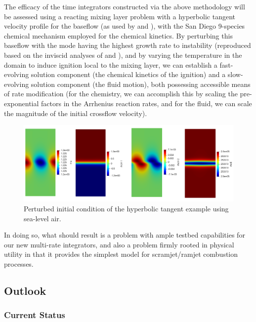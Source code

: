 The efficacy of the time integrators constructed via the above methodology will
be assessed using a reacting mixing layer problem with a hyperbolic tangent velocity profile
for the baseflow (as used by \cite{michalke1964inviscid} and \cite{blumen1970shear}), with
the San Diego 9-species chemical mechanism \cite{sandiego} employed for the chemical kinetics. By perturbing
this baseflow with the mode having the highest growth rate to instability (reproduced based
on the inviscid analyses of \cite{michalke1964inviscid} and \cite{blumen1970shear}), and by
varying the temperature in the domain to induce ignition local to the mixing layer, we can
establish a fast-evolving solution component (the chemical kinetics of the ignition) and a
slow-evolving solution component (the fluid motion), both possessing accessible
means of rate modification (for the chemistry, we can accomplish this by scaling the
pre-exponential factors in the Arrhenius reaction rates, and for the fluid, we can scale
the magnitude of the initial crossflow velocity).
\begin{figure}
\centering
\includegraphics[width=0.9\linewidth,trim=4 4 4 4,clip]{figures/hyperbolic_tangent_air.png}
\caption{Perturbed initial condition of the hyperbolic tangent example using sea-level air.}
\label{fig:hyperbolic_cold_rhov2}
\end{figure}
In doing so, what should result is a problem with ample testbed capabilities for our
new multi-rate integrators, and also a problem firmly rooted in physical utility in that
it provides the simplest model for scramjet/ramjet combustion processes.

\subsection{Outlook}

\subsubsection{Current Status}

